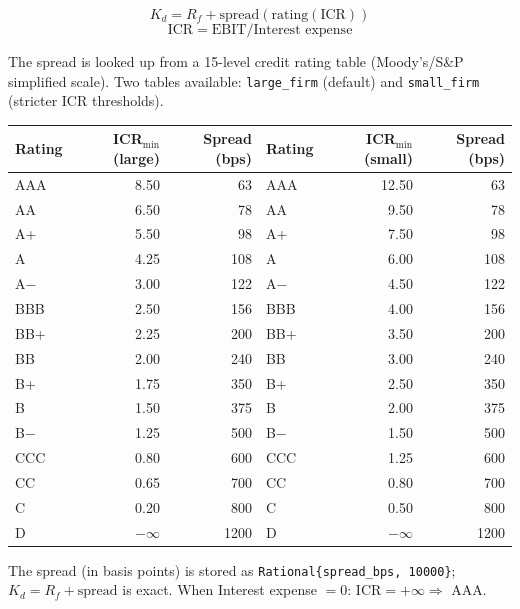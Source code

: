 \documentclass[11pt, a4paper, oneside]{article}
\newcommand{\EBIT}{\mathrm{EBIT}}
\newcommand{\Kd}{K_d}
\newcommand{\Rf}{R_f}
\begin{document}
\begin{equation}
  \Kd = \Rf + \mathrm{spread}(\mathrm{rating}(\mathrm{ICR}))
  \label{eq:kd}
\end{equation}
\begin{equation}
  \mathrm{ICR} = \EBIT / \text{Interest expense}
\end{equation}

The spread is looked up from a 15-level credit rating table
(Moody's/S\&P simplified scale).
Two tables available: \texttt{large\_firm} (default) and
\texttt{small\_firm} (stricter ICR thresholds).

\begin{center}
\small
\begin{tabular}{lrr|lrr}
\toprule
Rating & ICR$_{\min}$ (large) & Spread (bps) &
Rating & ICR$_{\min}$ (small) & Spread (bps)\\
\midrule
AAA   & 8.50 & 63   & AAA   & 12.50 & 63   \\
AA    & 6.50 & 78   & AA    & 9.50  & 78   \\
A+    & 5.50 & 98   & A+    & 7.50  & 98   \\
A     & 4.25 & 108  & A     & 6.00  & 108  \\
A$-$  & 3.00 & 122  & A$-$  & 4.50  & 122  \\
BBB   & 2.50 & 156  & BBB   & 4.00  & 156  \\
BB+   & 2.25 & 200  & BB+   & 3.50  & 200  \\
BB    & 2.00 & 240  & BB    & 3.00  & 240  \\
B+    & 1.75 & 350  & B+    & 2.50  & 350  \\
B     & 1.50 & 375  & B     & 2.00  & 375  \\
B$-$  & 1.25 & 500  & B$-$  & 1.50  & 500  \\
CCC   & 0.80 & 600  & CCC   & 1.25  & 600  \\
CC    & 0.65 & 700  & CC    & 0.80  & 700  \\
C     & 0.20 & 800  & C     & 0.50  & 800  \\
D     & $-\infty$ & 1200 & D & $-\infty$ & 1200\\
\bottomrule
\end{tabular}
\end{center}

\begin{impl}{}
The spread (in basis points) is stored as \texttt{Rational\{spread\_bps, 10000\}};
$\Kd = \Rf + \text{spread}$ is exact.
When Interest expense $= 0$: $\mathrm{ICR} = +\infty \Rightarrow$ AAA.
\end{impl}
\end{document}
